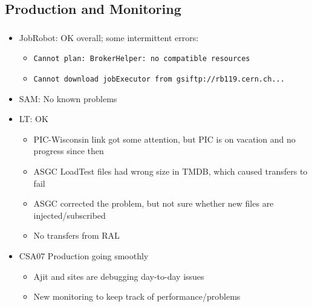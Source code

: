 \documentclass{beamer}
\begin{document}
\subsection{Production and Monitoring}
\begin{frame}
\frametitle{}
\begin{itemize}
    \item JobRobot: OK overall; some intermittent errors:
    \begin{itemize}
        \item {\tt Cannot plan: BrokerHelper: no compatible resources}
        \item {\tt Cannot download jobExecutor from gsiftp://rb119.cern.ch...}
    \end{itemize}
    \item SAM: No known problems
    \item LT: OK
    \begin{itemize}
        \item PIC-Wisconsin link got some attention, but PIC is on vacation and no progress since then
        \item ASGC LoadTest files had wrong size in TMDB, which caused transfers to fail
        \item ASGC corrected the problem, but not sure whether new files are injected/subscribed
        \item No transfers from RAL
    \end{itemize}
    \item CSA07 Production going smoothly
    \begin{itemize}
        \item Ajit and sites are debugging day-to-day issues
        \item New monitoring to keep track of performance/problems
    \end{itemize}
\end{itemize}
\end{frame}
\end{document}
